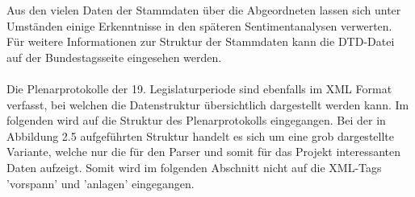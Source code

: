 Aus den vielen Daten der Stammdaten über die Abgeordneten lassen sich unter Umständen einige Erkenntnisse in den späteren Sentimentanalysen verwerten. Für weitere Informationen zur Struktur der Stammdaten kann die DTD-Datei auf der Bundestagsseite eingesehen werden.\\ \\
Die Plenarprotokolle der 19. Legislaturperiode sind ebenfalls im XML Format verfasst, bei welchen die Datenstruktur übersichtlich dargestellt werden kann. Im folgenden wird auf die Struktur des Plenarprotokolls eingegangen. Bei der in Abbildung 2.5 aufgeführten Struktur handelt es sich um eine grob dargestellte Variante, welche nur die für den Parser und somit für das Projekt interessanten Daten aufzeigt. Somit wird im folgenden Abschnitt nicht auf die XML-Tags 'vorspann' und 'anlagen' eingegangen.\\
